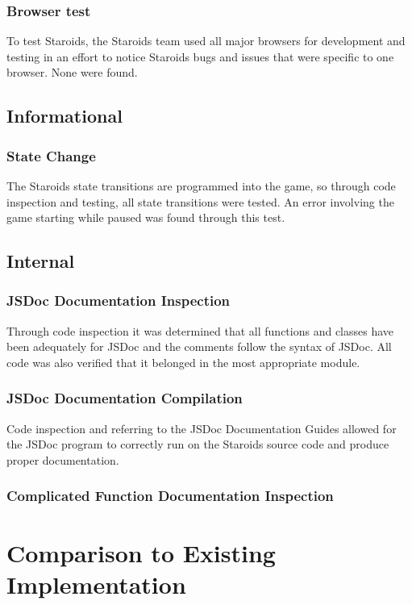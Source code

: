 \documentclass[12pt, titlepage]{article}
\begin{document}
\subsubsection{Browser test}
To test Staroids, the Staroids team used all major browsers for development and testing in an effort to notice Staroids bugs and issues that were specific to one browser. None were found.\\

\subsection{Informational}

\subsubsection{State Change}
The Staroids state transitions are programmed into the game, so through code inspection and testing, all state transitions were tested. An error involving the game starting while paused was found through this test.

\subsection{Internal}

\subsubsection{JSDoc Documentation Inspection}
Through code inspection it was determined that all functions and classes have been adequately for JSDoc and the comments follow the syntax of JSDoc. All code was also verified that it belonged in the most appropriate module.
\subsubsection{JSDoc Documentation Compilation}
Code inspection and referring to the JSDoc Documentation Guides allowed for the JSDoc program to correctly run on the Staroids source code and produce proper documentation.
\subsubsection{Complicated Function Documentation Inspection}


\section{Comparison to Existing Implementation}
\end{document}
